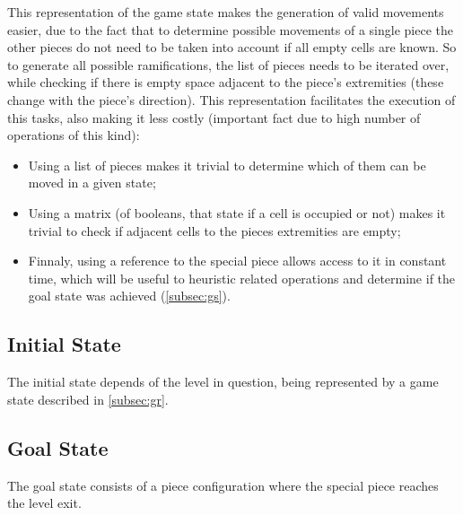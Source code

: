 \documentclass[conference]{IEEEtran}
\begin{document}
This representation of the game state makes the generation of valid movements easier, due to the fact that to determine possible movements of a single piece the other pieces do not need to be taken into account if all empty cells are known. So to generate all possible ramifications, the list of pieces needs to be iterated over, while checking if there is empty space adjacent to the piece's extremities (these change with the piece's direction). This representation facilitates the execution of this tasks, also making it less costly (important fact due to high number of operations of this kind):

\begin{itemize}
    \item Using a list of pieces makes it trivial to determine which of them can be moved in a given state;
    \item Using a matrix (of booleans, that state if a cell is occupied or not) makes it trivial to check if adjacent cells to the pieces extremities are empty;
    \item Finnaly, using a reference to the special piece allows access to it in constant time, which will be useful to heuristic related operations and determine if the goal state was achieved (\autoref{subsec:gs}).
\end{itemize}

\subsection{Initial State}
The initial state depends of the level in question, being represented by a game state described in \autoref{subsec:gr}.

\subsection{Goal State} \label{subsec:gs}
The goal state consists of a piece configuration where the special piece reaches the level exit.
\end{document}
